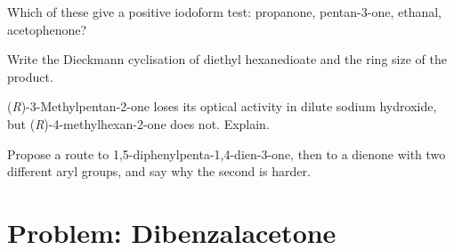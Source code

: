 \begin{exercise}[$\star\star$]\label{exo:b2:enolates-aldol:9}
Which of these give a positive iodoform test: propanone, pentan-3-one, ethanal, acetophenone?
\end{exercise}

\begin{exercise}[$\star\star\star$]\label{exo:b2:enolates-aldol:10}
Write the Dieckmann cyclisation of diethyl hexanedioate and the ring size of the product.
\end{exercise}

\begin{exercise}[$\star\star\star$]\label{exo:b2:enolates-aldol:11}
(\textit{R})-3-Methylpentan-2-one loses its optical activity in dilute sodium hydroxide, but
(\textit{R})-4-methylhexan-2-one does not. Explain.
\end{exercise}

\begin{exercise}[$\star\star\star$]\label{exo:b2:enolates-aldol:12}
Propose a route to 1,5-diphenylpenta-1,4-dien-3-one, then to a dienone with two different aryl groups,
and say why the second is harder.
\end{exercise}

\section{Problem: Dibenzalacetone}

